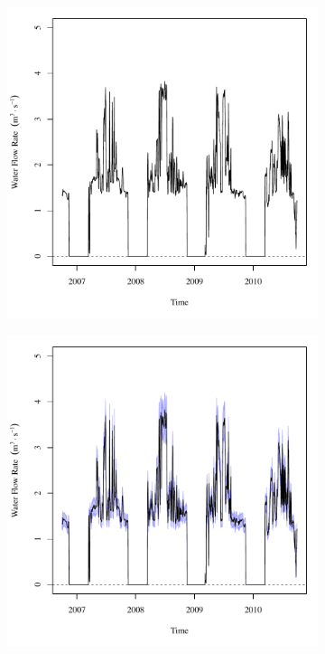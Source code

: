 \begin{linenumbers}
\begin{landscape}
\begin{figure}
\begin{subfigure}{0.7\textwidth}
			\includegraphics[width=\tableCustomSize]{"Figures/Results_USR/Deterministic/Q CON"}
		\end{subfigure}%
		\begin{subfigure}{0.7\textwidth}
			\centering
			\includegraphics[width=\tableCustomSize]{"Figures/Results_USR/Stochastic/Q CON"}

\end{subfigure}
\end{figure}
\end{landscape}
\end{linenumbers}
